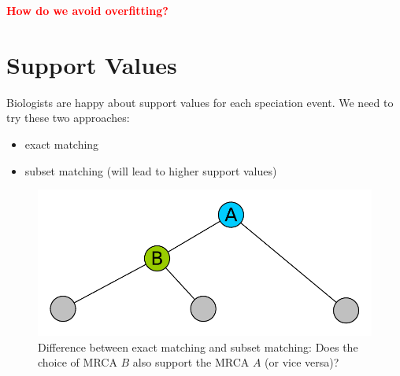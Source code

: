 \documentclass[10pt,a4paper]{article}
\begin{document}
\textcolor{red}{\textbf{How do we avoid overfitting?}}

\section{Support Values}
Biologists are happy about support values for each speciation event. We need to try these two approaches:
\begin{itemize}
	\item exact matching
	\item subset matching (will lead to higher support values)
\end{itemize}

\begin{figure}[h!]
\centering
\includegraphics[scale=0.2]{images/support_tree.pdf}
\caption{Difference between exact matching and subset matching: Does the choice of MRCA $B$ also support the MRCA $A$ (or vice versa)?}
\end{figure}
\end{document}
